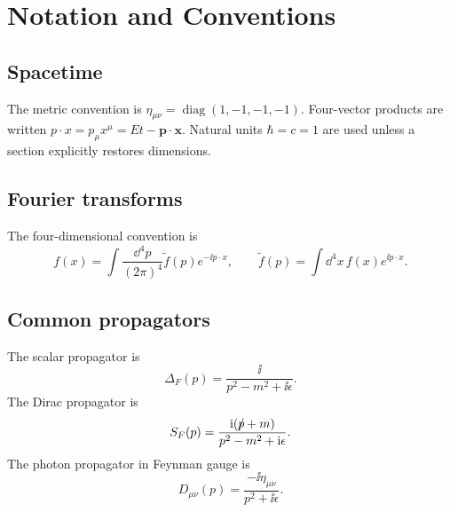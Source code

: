 \chapter{Notation and Conventions}

\section{Spacetime}

The metric convention is \(\eta_{\mu\nu}=\operatorname{diag}(1,-1,-1,-1)\).  Four-vector products are written \(p\cdot x=p_\mu x^\mu=Et-\bm p\cdot\bm x\).  Natural units \(\hbar=c=1\) are used unless a section explicitly restores dimensions.

\section{Fourier transforms}

The four-dimensional convention is
\[
  f(x)=\int\frac{\dd^4p}{(2\pi)^4}\tilde f(p)e^{-\ii p\cdot x},
  \qquad
  \tilde f(p)=\int\dd^4x\,f(x)e^{\ii p\cdot x}.
\]

\section{Common propagators}

The scalar propagator is
\[
  \Delta_F(p)=\frac{\ii}{p^2-m^2+\ii\epsilon}.
\]
The Dirac propagator is
\[
  S_F(p)=\frac{\mathrm i(p\!\!\!/+m)}{p^2-m^2+\mathrm i\epsilon}.
\]
The photon propagator in Feynman gauge is
\[
  D_{\mu\nu}(p)=\frac{-\ii\eta_{\mu\nu}}{p^2+\ii\epsilon}.
\]
